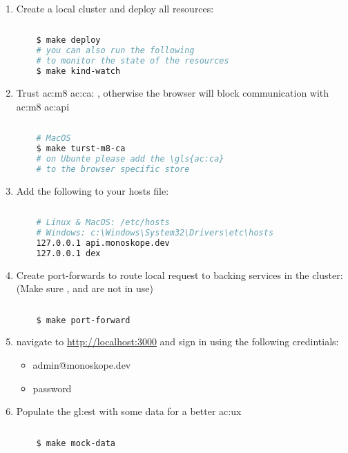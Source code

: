 \begin{enumerate}
  \item Create a local cluster and deploy all resources:

  \begin{lstlisting}[language=bash, caption={Deploy all resources to a local cluster}, label={sh:dartlc}]
    
    $ make deploy
    # you can also run the following 
    # to monitor the state of the resources
    $ make kind-watch
  \end{lstlisting}

  \item Trust \gls{ac:m8} \acrshort{ac:ca}: , otherwise the browser will block communication with \gls{ac:m8} \gls{ac:api}

  \begin{lstlisting}[language=bash, caption={Trust \gls{ac:m8} certificate authority}, label={sh:tmdc}]
    
    # MacOS
    $ make turst-m8-ca
    # on Ubunte please add the \gls{ac:ca} 
    # to the browser specific store
  \end{lstlisting}

  \item Add the following to your hosts file:

  \begin{lstlisting}[language=bash, caption={Update hosts file}, label={sh:uhf}]
    
    # Linux & MacOS: /etc/hosts
    # Windows: c:\Windows\System32\Drivers\etc\hosts
    127.0.0.1 api.monoskope.dev
    127.0.0.1 dex
  \end{lstlisting}

  \pagebreak

  \item Create port-forwards to route local request to backing services in the cluster: (Make sure ,  and  are not in use)

  \begin{lstlisting}[language=bash, caption={Create port-forwards to route local request}, label={sh:cpf}]
    
    $ make port-forward
  \end{lstlisting}

  \item navigate to \href{http://localhost:3000}{http://localhost:3000} and sign in using the following credintials:
  
  \begin{itemize}
    \item {} admin@monoskope.dev
    \item {} password
  \end{itemize}

  \item Populate the \gls{gl:est} with some data for a better \gls{ac:ux}

  \begin{lstlisting}[language=bash, caption={Populate the \gls{gl:est} with some data}, label={sh:pemd}]
    
    $ make mock-data
  \end{lstlisting}
\end{enumerate}
